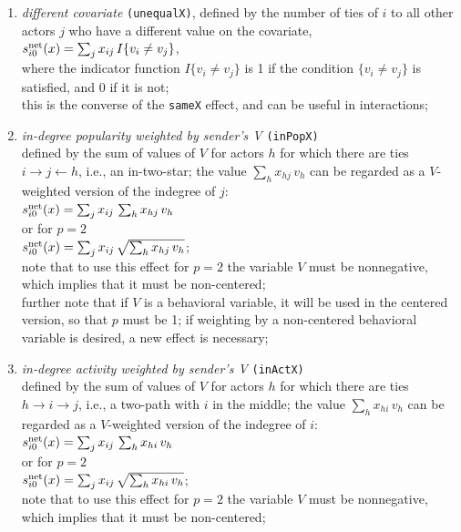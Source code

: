 \documentclass[a4paper,fleqn,11pt]{article}
\newcommand{\+}{\, + \,}
\newcommand{\vit}{\theenumi}
\begin{document}
\begin{enumerate}
 \item \emph{different covariate}  \texttt{(unequalX)},  defined by the
 number of ties of $i$ to all other actors $j$ who have
 a different value on the covariate,\\
 $s^{\rm net}_{i\vit}(x) = \sum_j x_{ij}\, I\{v_i \neq v_j \} $,\\
 where the indicator function $I\{v_i \neq v_j \} $ is 1 if the condition $\{v_i \neq v_j \} $
 is satisfied, and 0 if it is not;\\
 this is the converse of the  \texttt{sameX} effect,
 and can be useful in interactions;

 \item {\em in-degree popularity weighted by sender's V }
  \texttt{(inPopX)}\\
 defined by the sum of values of $V$ for actors $h$
 for which there are ties  $ i \rightarrow j \leftarrow h$,
 i.e., an in-two-star;
 the value $\sum_h x_{hj}\,v_h$ can be regarded as a $V$-weighted
 version of the indegree of $j$:\\
 $s^{\rm net}_{i\vit}(x) =  \sum_j x_{ij}\, \sum_h x_{hj}\,v_h  $ \\
 or for $p=2$ \\
   $s^{\rm net}_{i\vit}(x) =  \sum_j x_{ij}\, \sqrt{\sum_h x_{hj}\,v_h}   $;\\
 note that to use this effect for $p=2$ the variable $V$ must be nonnegative,
 which implies that it must be non-centered;\\
 further note that if $V$ is a behavioral variable, it will be used
 in the centered version, so that $p$ must be 1; if weighting by
 a non-centered behavioral variable is desired, a new effect is necessary;

 \item {\em in-degree activity weighted by sender's V } \texttt{(inActX)}\\
 defined by the sum of values of $V$ for actors $h$
 for which there are ties  $h \rightarrow i \rightarrow j$,
 i.e., a two-path with $i$ in the middle;
 the value $\sum_h x_{hi}\,v_h$ can be regarded as a $V$-weighted
 version of the indegree of $i$:\\
 $s^{\rm net}_{i\vit}(x) =  \sum_j x_{ij}\, \sum_h x_{hi}\,v_h  $ \\
 or for $p=2$ \\
   $s^{\rm net}_{i\vit}(x) =  \sum_j x_{ij}\, \sqrt{\sum_h x_{hi}\,v_h}   $;\\
 note that to use this effect for $p=2$ the variable $V$ must be nonnegative,
 which implies that it must be non-centered;



\end{enumerate}
\end{document}
